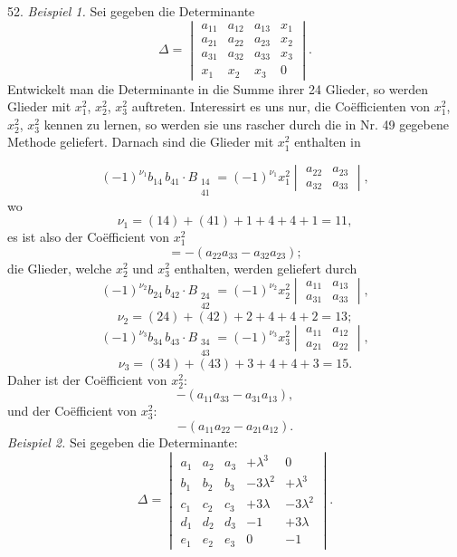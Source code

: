 52. \textit{Beispiel 1.} Sei gegeben die Determinante
\[
\Delta = \begin{vmatrix} a_{11} & a_{12} & a_{13} & x_1 \\ a_{21} & a_{22} & a_{23} & x_2 \\ a_{31} & a_{32} & a_{33} & x_3 \\ x_1 & x_2 & x_3 & 0 \end{vmatrix}.
\]
Entwickelt man die Determinante in die Summe ihrer 24 Glieder, so werden Glieder mit $x_1^2$, $x_2^2$, $x_3^2$ auftreten. Interessirt es uns nur, die Co\"efficienten von $x_1^2$, $x_2^2$, $x_3^2$ kennen zu lernen, so werden sie uns rascher durch die in Nr. 49 gegebene Methode geliefert. Darnach sind die Glieder mit $x_1^2$ enthalten in


\[
(-1)^{\nu_1} b_{14}\, b_{41} \cdot B_{\substack{14 \\ 41}} = (-1)^{\nu_1} x_1^2 \begin{vmatrix} a_{22} & a_{23} \\ a_{32} & a_{33} \end{vmatrix},
\]
wo
\[
\nu_1 = (14) + (41) + 1 + 4 + 4 + 1 = 11,
\]
es ist also der Co\"efficient von $x_1^2$
\[
= - (a_{22} a_{33} - a_{32} a_{23});
\]
die Glieder, welche $x_2^2$ und $x_3^2$ enthalten, werden geliefert durch
\[
(-1)^{\nu_2} b_{24}\, b_{42} \cdot B_{\substack{24 \\ 42}} = (-1)^{\nu_2} x_2^2 \begin{vmatrix} a_{11} & a_{13} \\ a_{31} & a_{33} \end{vmatrix},
\]
\[
\nu_2 = (24) + (42) + 2 + 4 + 4 + 2 = 13;
\]
\[
(-1)^{\nu_3} b_{34}\, b_{43} \cdot B_{\substack{34 \\ 43}} = (-1)^{\nu_3} x_3^2 \begin{vmatrix} a_{11} & a_{12} \\ a_{21} & a_{22} \end{vmatrix},
\]
\[
\nu_3 = (34) + (43) + 3 + 4 + 4 + 3 = 15.
\]
Daher ist der Co\"efficient von $x_2^2$:
\[
- (a_{11} a_{33} - a_{31} a_{13}),
\]
und der Co\"efficient von $x_3^2$:
\[
- (a_{11} a_{22} - a_{21} a_{12}).
\]
\textit{Beispiel 2.} Sei gegeben die Determinante:
\[
\Delta = \begin{vmatrix}
a_1 & a_2 & a_3 & +\lambda^3 & 0 \\
b_1 & b_2 & b_3 & -3\lambda^2 & +\lambda^3 \\
c_1 & c_2 & c_3 & +3\lambda & -3\lambda^2 \\
d_1 & d_2 & d_3 & -1 & +3\lambda \\
e_1 & e_2 & e_3 & 0 & -1
\end{vmatrix}.
\]
